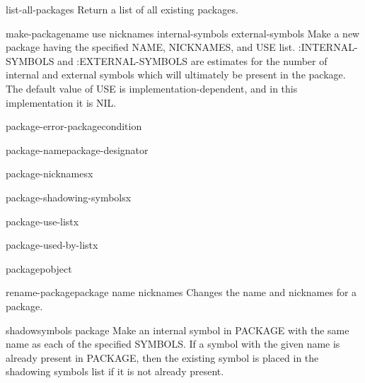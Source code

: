 \documentclass[10pt,english]{book}
\begin{document}
\begin{function}{list-all-packages}{}
  Return a list of all existing packages.
\end{function}

\begin{function}{make-package}{name \key use nicknames internal-symbols external-symbols}
  Make a new package having the specified NAME, NICKNAMES, and USE
list. :INTERNAL-SYMBOLS and :EXTERNAL-SYMBOLS are estimates for the number of
internal and external symbols which will ultimately be present in the package.
The default value of USE is implementation-dependent, and in this
implementation it is NIL.
\end{function}

\begin{function}{package-error-package}{condition}
  
\end{function}

\begin{function}{package-name}{package-designator}
  
\end{function}

\begin{function}{package-nicknames}{x}
  
\end{function}

\begin{function}{package-shadowing-symbols}{x}
  
\end{function}

\begin{function}{package-use-list}{x}
  
\end{function}

\begin{function}{package-used-by-list}{x}
  
\end{function}

\begin{function}{packagep}{object}
  
\end{function}

\begin{function}{rename-package}{package name \op nicknames}
  Changes the name and nicknames for a package.
\end{function}

\begin{function}{shadow}{symbols \op package}
  Make an internal symbol in PACKAGE with the same name as each of the
specified SYMBOLS. If a symbol with the given name is already present in
PACKAGE, then the existing symbol is placed in the shadowing symbols list if
it is not already present.
\end{function}
\end{document}
